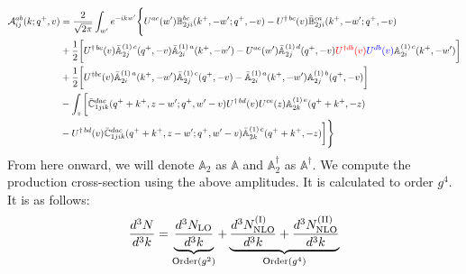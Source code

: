 \documentclass[10pt]{article}
\def\mf#1{\mathbb{#1}}
\numberwithin{equation}{section}
\begin{document}
\begin{align}
     {\cal A}^{ab}_{ij}(k; q^+, v) & = \frac{2}{\sqrt{2\pi}} \int_{w^{\prime}}e^{-i k w^\prime}\Bigg\{U^{ac}(w^{\prime}) \mf{B}^{bc}_{2ji}(k^{+},-w^{\prime};q^{+},-v)-U^{\dagger\, bc}(v)\Bar{\mf{B}}^{ca}_{2ji}(k^{+},-w^{\prime}; q^{+},-v)\notag \\ & +\frac{1}{2}\bigg[U^{\dagger\, bc}(v)\Bar{\mf{A}}^{(1)\, c}_{2j}(q^{+},-v)\Bar{\mf{A}}^{(1)\, a}_{2i}(k^{+},-w^{\prime})-U^{ac}(w^{\prime}) \Bar{\mf{A}}^{(1)\, d}_{2j}(q^{+},-v)\textcolor{red}{U^{\dagger db}(v)}\textcolor{blue}{U^{db}(v)} \mf{A}^{(1)\, c}_{2i}(k^{+},- w^{\prime})\bigg]\notag \\ & +\frac{1}{2}\bigg[U^{\dagger bc}(v)\Bar{\mf{A}}^{(1)\, a}_{2i}(k^{+},- w^{\prime})\Bar{\mf{A}}^{(1)\, c}_{2j}(q^{+},-v)-\Bar{\mf{A}}^{(1)\, a}_{2i}(k^{+},- w^{\prime}) \mf{A}^{(1)\, b}_{2j}(q^{+},- v)\bigg]\notag \\ & -\int_{z}\bigg[\Bar{\mf{C}}^{dac}_{1jik}(q^{+}+k^{+},z-w^{\prime}; q^{+},w^{\prime}-v)U^{\dagger\, bd}(v)U^{ce}(z) \mf{A}^{(1)\,e}_{2k}(q^{+}+k^{+},-z)\notag \\ &-U^{\dagger\, bd}(v) \Bar{\mf{C}}^{dac}_{1jik}(q^{+}+k^{+},z-w^{\prime}; q^{+},w^{\prime}-v)\Bar{\mf{A}}^{(1)\,c}_{2k}(q^{+}+k^{+},-z)\bigg]\Bigg\}
\end{align}
From here onward, we will denote $\mf{A}_{2}$ as $\mf{A}$ and $\mf{A}^{\dagger}_{2}$ as $\mf{A}^{\dagger}$. We compute the production cross-section using the above amplitudes. It is calculated to order $g^{4}$. It is as follows:
\begin{align}
    \frac{d^{3}N}{d^{3}k} = 
     \underbrace{\frac{d^{3}N_{\rm LO}}{d^{3}k}}_{\text{Order}(g^{2})}
     + 
    \underbrace{ \frac{d^{3}N_{\rm NLO}^{\rm (I)}}{d^{3}k}
     + \frac{d^{3}N_{\rm NLO}^{\rm (II)}}{d^{3}k}}_{\text{Order}(g^{4})}
\end{align}
\end{document}
